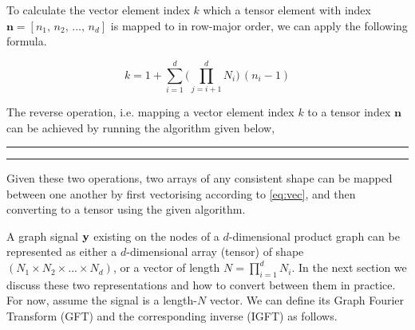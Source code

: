 {\vspace{0.5cm}

To calculate the vector element index $k$ which a tensor element with index $\mathbf{n} = [n_1,\, n_2,\, ...,\, n_d]$ is mapped to in row-major order, we can apply the following formula.  

\begin{equation}
    \label{eq:vec}
    k = 1 + \sum_{i=1}^d \Big( \prod_{j=i+1}^d N_i \Big) \, (n_i - 1)
\end{equation}

The reverse operation, i.e. mapping a vector element index $k$ to a tensor index $\mathbf{n}$ can be achieved by running the algorithm given below, 

\vspace{0.5cm}

\hrule

\vspace{0.2cm}

\begin{algorithmic}
\vspace{0.15cm}
\vspace{0.1cm}
\vspace{0.25cm}
\vspace{0.25cm}
\vspace{0.15cm}
\vspace{0.15cm}
\EndFor
\vspace{0.25cm}
\end{algorithmic}

\vspace{0.2cm}
\hrule

\vspace{0.5cm}

Given these two operations, two arrays of any consistent shape can be mapped between one another by first vectorising according to \cref{eq:vec}, and then converting to a tensor using the given algorithm.

}

A graph signal $\mathbf{y}$ existing on the nodes of a $d$-dimensional product graph can be represented as either a $d$-dimensional array (tensor) of shape $(N_1 \times N_2 \times ... \times N_d)$, or a vector of length $N = \prod_{i=1}^d N_i$. In the next section we discuss these two representations and how to convert between them in practice. For now, assume the signal is a length-$N$ vector. We can define its Graph Fourier Transform (GFT) and the corresponding inverse (IGFT) as follows. 

